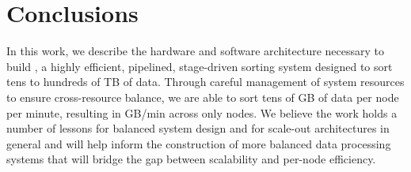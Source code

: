 \section{Conclusions}
\label{sec:conclusions}

In this work, we describe the hardware and software architecture necessary to
build \tritonsort, a highly efficient, pipelined, stage-driven sorting system
designed to sort tens to hundreds of TB of data.  Through careful management of
system resources to ensure cross-resource balance, we are able to sort tens of
GB of data per node per minute, resulting in \tsrate GB/min across only
\tsnodes nodes.  We believe the work holds a number of lessons for balanced
system design and for scale-out architectures in general and will help inform
the construction of more balanced data processing systems that will bridge the
gap between scalability and per-node efficiency.

